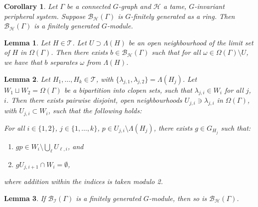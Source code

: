 \documentclass[10pt,a4paper]{amsart}
\newtheorem{corollary}{Corollary}
\newtheorem{lemma}{Lemma}
\newcommand{\br}{{\mathscr{B}}}
\newcommand{\per}{\mathcal{H}}
\begin{document}
\begin{corollary}\label{cor:gen-set-upgrade-rel-cuts}
    Let $\Gamma$ be a connected $G$-graph and $\per$ a tame, $G$-invariant peripheral system. Suppose $\br_\per(\Gamma)$ is $G$-finitely generated as a ring. Then $\br_\per(\Gamma)$ is a finitely generated $G$-module. 
\end{corollary}

    \begin{lemma}\label{claim:finding-the-special-cut}
        Let $H \in \mathcal T$. Let $U \supset \Lambda(H)$ be an open neighbourhood of the limit set of $H$ in $\Omega(\Gamma)$. Then there exists $b \in \br_\per(\Gamma)$ such that for all $\omega \in \Omega(\Gamma) \setminus U$, we have that $b$ separates $\omega$ from $\Lambda(H)$. 
    \end{lemma}

    \begin{lemma}\label{claim:technical-boundary-claim}
        Let $H_1, \ldots, H_k \in \mathcal T$, with $\{\lambda_{j,1}, \lambda_{j,2}\} = \Lambda(H_j)$. Let $W_1 \sqcup W_2 = \Omega(\Gamma)$ be a bipartition into clopen sets, such that $\lambda_{j,i} \in W_i$ for all $j$, $i$. Then there exists pairwise disjoint, open neighbourhoods $U_{j,i} \ni \lambda_{j,i}$ in $\Omega(\Gamma)$, with $U_{j,i} \subset W_i$, such that the following holds:
            
            For all $i \in \{1,2\}$, $j \in \{1,\ldots, k\}$, $p \in U_{j,i} \setminus \Lambda(H_j)$, there exists $g \in G_{H_j}$ such that:
            \begin{enumerate}
                \item\label{itm:dynamics-property-1} $gp \in W_i \setminus \bigcup _\ell U_{\ell, i}$, and

                \item\label{itm:dynamics-property-2} $gU_{j,i+1} \cap W_i= \emptyset$,
            \end{enumerate}
            where addition within the indices is taken modulo 2.
    \end{lemma}

    \begin{lemma}\label{claim:I-fg-implies-H-fg}
        If $\br_{\mathcal I}(\Gamma)$ is a finitely generated $G$-module, then so is $\br_\per(\Gamma)$. 
    \end{lemma}
\end{document}
